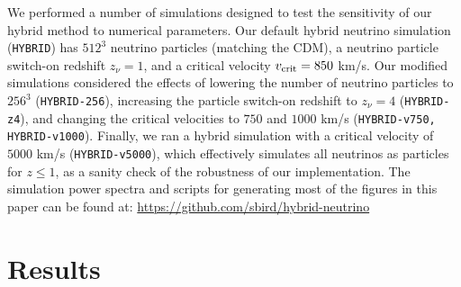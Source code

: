 \documentclass[useAMS, usenatbib]{mnras}
\begin{document}
We performed a number of simulations designed to test the sensitivity of our hybrid method to numerical parameters. Our default hybrid neutrino simulation (\texttt{HYBRID}) has $512^3$ neutrino particles (matching the CDM), a neutrino particle switch-on redshift $z_\nu = 1$, and a critical velocity $v_{\rm crit} = 850$ km/s. Our modified simulations considered the effects of lowering the number of neutrino particles to $256^3$ (\texttt{HYBRID-256}), increasing the particle switch-on redshift to $z_\nu = 4$ (\texttt{HYBRID-z4}), and changing the critical velocities to $750$ and $1000$ km/s (\texttt{HYBRID-v750, HYBRID-v1000}). Finally, we ran a hybrid simulation with a critical velocity of $5000$ km/s (\texttt{HYBRID-v5000}), which effectively simulates all neutrinos as particles for $z \leq 1$, as a sanity check of the robustness of our implementation.  The simulation power spectra and scripts for generating most of the figures in this paper can be found at: \url{https://github.com/sbird/hybrid-neutrino}


\section{Results}
\label{sec:results}
\end{document}
